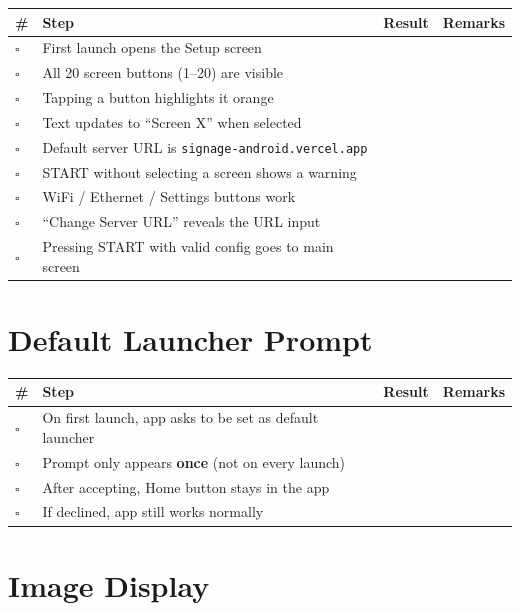 \documentclass[11pt,a4paper]{article}
\newcommand{\checkbox}{$\square$\;}
\begin{document}
\begin{tabular}{@{}p{0.5cm}p{10cm}p{2cm}p{3cm}@{}}
\toprule
\textbf{\#} & \textbf{Step} & \textbf{Result} & \textbf{Remarks} \\
\midrule
\checkbox & First launch opens the Setup screen & & \\[0.3cm]
\checkbox & All 20 screen buttons (1--20) are visible & & \\[0.3cm]
\checkbox & Tapping a button highlights it \textcolor{cncOrange}{orange} & & \\[0.3cm]
\checkbox & Text updates to ``Screen X'' when selected & & \\[0.3cm]
\checkbox & Default server URL is \texttt{signage-android.vercel.app} & & \\[0.3cm]
\checkbox & START without selecting a screen shows a warning & & \\[0.3cm]
\checkbox & WiFi / Ethernet / Settings buttons work & & \\[0.3cm]
\checkbox & ``Change Server URL'' reveals the URL input & & \\[0.3cm]
\checkbox & Pressing START with valid config goes to main screen & & \\
\bottomrule
\end{tabular}

\section{Default Launcher Prompt}

\begin{tabular}{@{}p{0.5cm}p{10cm}p{2cm}p{3cm}@{}}
\toprule
\textbf{\#} & \textbf{Step} & \textbf{Result} & \textbf{Remarks} \\
\midrule
\checkbox & On first launch, app asks to be set as default launcher & & \\[0.3cm]
\checkbox & Prompt only appears \textbf{once} (not on every launch) & & \\[0.3cm]
\checkbox & After accepting, Home button stays in the app & & \\[0.3cm]
\checkbox & If declined, app still works normally & & \\
\bottomrule
\end{tabular}

\section{Image Display}
\end{document}
